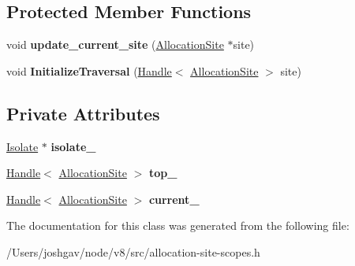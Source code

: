 \subsection*{Protected Member Functions}
\begin{DoxyCompactItemize}
\item 
void {\bfseries update\+\_\+current\+\_\+site} (\hyperlink{classv8_1_1internal_1_1_allocation_site}{Allocation\+Site} $\ast$site)\hypertarget{classv8_1_1internal_1_1_allocation_site_context_a2e094902dbadc8931c82eb04333807c0}{}\label{classv8_1_1internal_1_1_allocation_site_context_a2e094902dbadc8931c82eb04333807c0}

\item 
void {\bfseries Initialize\+Traversal} (\hyperlink{classv8_1_1internal_1_1_handle}{Handle}$<$ \hyperlink{classv8_1_1internal_1_1_allocation_site}{Allocation\+Site} $>$ site)\hypertarget{classv8_1_1internal_1_1_allocation_site_context_a2ae0994fc850605cbea75aeddf980b44}{}\label{classv8_1_1internal_1_1_allocation_site_context_a2ae0994fc850605cbea75aeddf980b44}

\end{DoxyCompactItemize}
\subsection*{Private Attributes}
\begin{DoxyCompactItemize}
\item 
\hyperlink{classv8_1_1internal_1_1_isolate}{Isolate} $\ast$ {\bfseries isolate\+\_\+}\hypertarget{classv8_1_1internal_1_1_allocation_site_context_a774ff272d33c5c3c423cba36caa8a66b}{}\label{classv8_1_1internal_1_1_allocation_site_context_a774ff272d33c5c3c423cba36caa8a66b}

\item 
\hyperlink{classv8_1_1internal_1_1_handle}{Handle}$<$ \hyperlink{classv8_1_1internal_1_1_allocation_site}{Allocation\+Site} $>$ {\bfseries top\+\_\+}\hypertarget{classv8_1_1internal_1_1_allocation_site_context_a17471d31386627bbb4fdc62058bddd5e}{}\label{classv8_1_1internal_1_1_allocation_site_context_a17471d31386627bbb4fdc62058bddd5e}

\item 
\hyperlink{classv8_1_1internal_1_1_handle}{Handle}$<$ \hyperlink{classv8_1_1internal_1_1_allocation_site}{Allocation\+Site} $>$ {\bfseries current\+\_\+}\hypertarget{classv8_1_1internal_1_1_allocation_site_context_a9c419688f56549c620c1d35e77d596e2}{}\label{classv8_1_1internal_1_1_allocation_site_context_a9c419688f56549c620c1d35e77d596e2}

\end{DoxyCompactItemize}


The documentation for this class was generated from the following file\+:\begin{DoxyCompactItemize}
\item 
/\+Users/joshgav/node/v8/src/allocation-\/site-\/scopes.\+h\end{DoxyCompactItemize}

